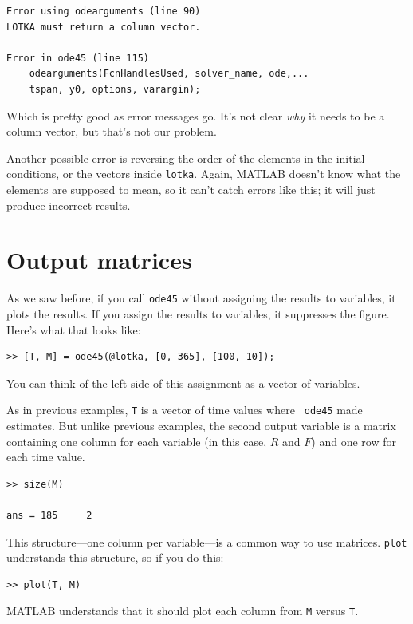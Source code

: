 \documentclass{book}
\begin{document}
\begin{verbatim}
Error using odearguments (line 90)
LOTKA must return a column vector.

Error in ode45 (line 115)
    odearguments(FcnHandlesUsed, solver_name, ode,...
    tspan, y0, options, varargin);
\end{verbatim}

Which is pretty good as error messages go.  It's not clear {\em why}
it needs to be a column vector, but that's not our problem.

Another possible error is reversing the order of the elements in the
initial conditions, or the vectors inside {\tt lotka}.  Again, MATLAB
doesn't know what the elements are supposed to mean, so it can't catch
errors like this; it will just produce incorrect results.


\section{Output matrices}

As we saw before, if you call {\tt ode45} without assigning the
results to variables, it plots the results.
If you assign
the results to variables, it suppresses the figure.
Here's what that looks like:

\begin{verbatim}
>> [T, M] = ode45(@lotka, [0, 365], [100, 10]);
\end{verbatim}

You can think of the left side of this assignment as a vector
of variables.

As in previous examples, {\tt T} is a vector of time values where {\tt
ode45} made estimates.  But unlike previous examples, the
second output variable is a matrix containing one column for each
variable (in this case, $R$ and $F$) and one row for each time value.

\begin{verbatim}
>> size(M)

ans = 185     2
\end{verbatim}

This structure---one column per variable---is a common way to
use matrices.  {\tt plot} understands this structure, so if you
do this:

\begin{verbatim}
>> plot(T, M)
\end{verbatim}

MATLAB understands that it should plot each column from {\tt M}
versus {\tt T}.
\end{document}

